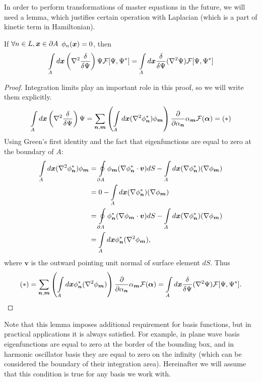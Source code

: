 In order to perform transformations of master equations in the future,
we will need a lemma, which justifies certain operation with Laplacian
(which is a part of kinetic term in Hamiltonian).

\begin{lemma}
\label{lmm:formalism:func-calculus:move-laplacian}
If $\forall n \in L, \boldsymbol{x} \in \partial A$ $\phi_n(\boldsymbol{x}) = 0$, then
\[
	\int\limits_A d\boldsymbol{x} \left(
		\nabla^2 \frac{\delta}{\delta \Psi}
	\right) \Psi \mathcal{F}[\Psi, \Psi^*]
	= \int\limits_A d\boldsymbol{x} \frac{\delta}{\delta \Psi}
	( \nabla^2 \Psi ) \mathcal{F}[\Psi, \Psi^*]
\]
\end{lemma}
\begin{proof}
Integration limits play an important role in this proof,
so we will write them explicitly.
\begin{equation*}
\begin{split}
	\int\limits_A d\boldsymbol{x} \left(
		\nabla^2 \frac{\delta}{\delta \Psi}
	\right) \Psi
	= \sum_{\boldsymbol{n}, \boldsymbol{m}} \left(
			\int\limits_A d\boldsymbol{x} ( \nabla^2 \phi_{\boldsymbol{n}}^* ) \phi_{\boldsymbol{m}}
		\right)
		\frac{\partial}{\partial \alpha_{\boldsymbol{n}}} \alpha_{\boldsymbol{m}} \mathcal{F}(\bm{\alpha})
	= (*)
\end{split}
\end{equation*}
Using Green's first identity and the fact that eigenfunctions are equal to zero at the boundary of $A$:
\begin{equation*}
\begin{split}
	\int\limits_A d\boldsymbol{x} ( \nabla^2 \phi_{\boldsymbol{n}}^* ) \phi_{\boldsymbol{m}}
	& = \oint\limits_{\partial A} \phi_{\boldsymbol{m}} (\nabla \phi_{\boldsymbol{n}}^* \cdot \bm{v}) dS
	- \int\limits_A d\boldsymbol{x} ( \nabla \phi_{\boldsymbol{n}}^* ) ( \nabla \phi_{\boldsymbol{m}} ) \\
	& = 0 - \int\limits_A d\boldsymbol{x} ( \nabla \phi_{\boldsymbol{n}}^* ) ( \nabla \phi_{\boldsymbol{m}} ) \\
	& = \oint\limits_{\partial A} \phi_{\boldsymbol{n}}^* (\nabla \phi_{\boldsymbol{m}} \cdot \bm{v}) dS
	- \int\limits_A d\boldsymbol{x} ( \nabla \phi_{\boldsymbol{n}}^* ) ( \nabla \phi_{\boldsymbol{m}} ) \\
	& = \int\limits_A d\boldsymbol{x} \phi_{\boldsymbol{n}}^* ( \nabla^2 \phi_{\boldsymbol{m}} ),
\end{split}
\end{equation*}
where $\bm{v}$ is the outward pointing unit normal of surface element $dS$.
Thus
\[
	(*)
	= \sum_{\boldsymbol{n}, \boldsymbol{m}} \left(
			\int\limits_A d\boldsymbol{x} \phi_{\boldsymbol{n}}^* ( \nabla^2 \phi_{\boldsymbol{m}} )
		\right)
		\frac{\partial}{\partial \alpha_{\boldsymbol{n}}} \alpha_{\boldsymbol{m}} \mathcal{F}(\bm{\alpha})
	= \int\limits_A d\boldsymbol{x} \frac{\delta}{\delta \Psi}
		( \nabla^2 \Psi ) \mathcal{F}[\Psi, \Psi^*].
	\qedhere
\]
\end{proof}

Note that this lemma imposes additional requirement for basis functions,
but in practical applications it is always satisfied.
For example, in plane wave basis eigenfunctions are equal to zero at the border of the bounding box,
and in harmonic oscillator basis they are equal to zero on the infinity
(which can be considered the boundary of their integration area).
Hereinafter we will assume that this condition is true for any basis we work with.
